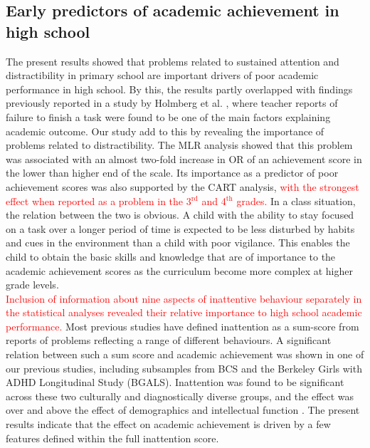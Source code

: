 \documentclass[10pt,letterpaper]{article}
\begin{document}
{{%

\subsection*{Early predictors of academic achievement in high school}
The present results showed that problems related to sustained attention and distractibility in primary school are important drivers of poor academic performance in high school. By this, the results partly overlapped with findings previously reported in a study by Holmberg et al. \cite{Holmberg2014}, where  teacher reports of failure to finish a task were found to be one of the main factors explaining academic outcome. 
Our study add to this by revealing the importance of problems related to distractibility. The MLR analysis showed that this problem was associated with an almost two-fold increase in OR of an achievement score in the lower than higher end of the scale. Its importance as a predictor of poor achievement scores was also supported by the CART analysis, \textcolor{red}{with the strongest effect when reported as a problem in the  3$^{\text{rd}}$ and 4$^{\text{th}}$ grades.}  In a class situation, the relation between the two is obvious. A child with the ability to stay focused on a task over a longer period of time is expected to be less disturbed by habits and cues in the environment than a child with poor vigilance.  This enables the child to obtain the basic skills and knowledge that are of importance to the academic achievement scores as the curriculum become more complex at higher grade levels. \\

\textcolor{red}{Inclusion of information about nine aspects of inattentive behaviour separately in the statistical analyses revealed their relative importance to high school academic performance.} Most previous studies have defined inattention as a sum-score from reports of problems reflecting a range of different behaviours. A significant relation between such a sum score and academic achievement was shown in one of our previous studies, including subsamples from BCS and the Berkeley Girls with ADHD Longitudinal Study (BGALS). Inattention was found to be significant across these two culturally and diagnostically diverse groups, and the effect was over and above the effect of demographics and intellectual function \cite{Lundervold2017}. The present results indicate that the effect on academic achievement is driven by a few features defined within the full inattention score.  \\

}}
\end{document}
